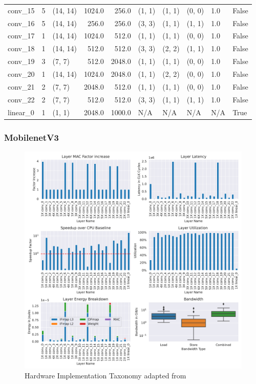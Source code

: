 \begin{center}
\begin{tabular}{lrlrrlllll}
        conv\_15  & 5 &    (14, 14) &  1024.0 &   256.0 &  (1, 1) &  (1, 1) &  (0, 0) &    1.0 &  False \\
        conv\_16  & 5 &    (14, 14) &   256.0 &   256.0 &  (3, 3) &  (1, 1) &  (1, 1) &    1.0 &  False \\
        conv\_17  & 1 &    (14, 14) &  1024.0 &   512.0 &  (1, 1) &  (1, 1) &  (0, 0) &    1.0 &  False \\
        conv\_18  & 1 &    (14, 14) &   512.0 &   512.0 &  (3, 3) &  (2, 2) &  (1, 1) &    1.0 &  False \\
        conv\_19  & 3 &      (7, 7) &   512.0 &  2048.0 &  (1, 1) &  (1, 1) &  (0, 0) &    1.0 &  False \\
        conv\_20  & 1 &    (14, 14) &  1024.0 &  2048.0 &  (1, 1) &  (2, 2) &  (0, 0) &    1.0 &  False \\
        conv\_21  & 2 &      (7, 7) &  2048.0 &   512.0 &  (1, 1) &  (1, 1) &  (0, 0) &    1.0 &  False \\
        conv\_22  & 2 &      (7, 7) &   512.0 &   512.0 &  (3, 3) &  (1, 1) &  (1, 1) &    1.0 &  False \\
        linear\_0 & 1 &      (1, 1) &  2048.0 &  1000.0 &     N/A &     N/A &     N/A &    N/A &   True \\
        \bottomrule
        \end{tabular}
\end{center}

\subsubsection{MobilenetV3}
\begin{figure}[ht]
    \centering
    \includegraphics[scale=0.6]{Plots/networks/resnet50.pdf}
    \caption{Hardware Implementation Taxonomy adapted from \cite{maestro}}
    \label{fig:hw_taxonomy}
\end{figure}


